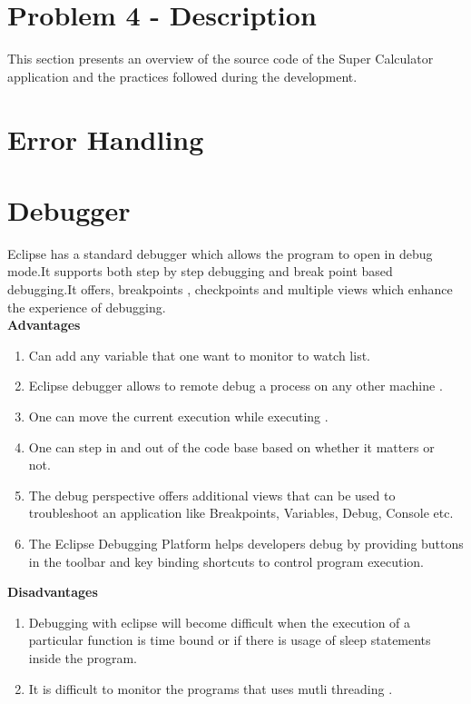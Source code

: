 \documentclass[a4paper, 11pt]{report}
\begin{document}
\section*{\textbf{Problem 4 - Description}}
This section presents an overview of the source code of the Super Calculator application and the
practices followed during the development.
\section*{Error Handling}
\section*{Debugger}
Eclipse has a standard debugger which allows the program to open in debug mode.It supports both step by step debugging and break point based debugging.It offers, breakpoints , checkpoints and multiple views which enhance the experience of debugging.\\

\textbf{Advantages}

\begin{enumerate}
  \item Can add any variable that one want to monitor to watch list.\
  \item Eclipse debugger allows to remote debug a process on any other machine .\
  \item One can move the current execution while executing . \
  \item One can step in and out of the code base based on whether it matters or not.\
  \item The debug perspective offers additional views that can be used to troubleshoot an application like Breakpoints, Variables, Debug, Console etc. \
  \item The Eclipse Debugging Platform helps developers debug by providing buttons in the toolbar and key binding shortcuts to control program execution. \
\end{enumerate}

\textbf{Disadvantages}
\begin{enumerate}
\item Debugging with eclipse will become difficult when the execution  of a particular function is time bound or if there is usage of sleep statements inside the program. \
\item It is difficult to monitor the programs that uses mutli threading . \
\end{enumerate}
\end{document}
